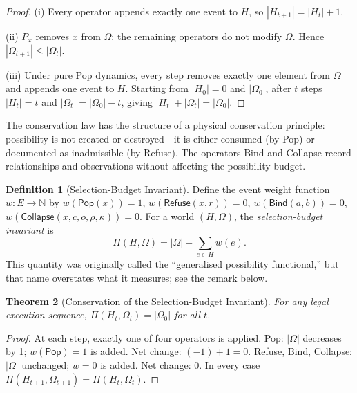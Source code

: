 \documentclass[12pt, a4paper, openany]{book}
\theoremstyle{plain}
\newtheorem{theorem}{Theorem}[chapter]
\theoremstyle{definition}
\newtheorem{definition}[theorem]{Definition}
\theoremstyle{remark}
\newcommand{\Pop}{\mathsf{Pop}}
\newcommand{\Refuse}{\mathsf{Refuse}}
\newcommand{\Bind}{\mathsf{Bind}}
\newcommand{\Collapse}{\mathsf{Collapse}}
\begin{document}
\begin{proof}
(i) Every operator appends exactly one event to $H$, so $|H_{t+1}| = |H_t| + 1$.

(ii) $P_x$ removes $x$ from $\Omega$; the remaining operators do not modify
$\Omega$. Hence $|\Omega_{t+1}| \leq |\Omega_t|$.

(iii) Under pure Pop dynamics, every step removes exactly one element from $\Omega$
and appends one event to $H$. Starting from $|H_0| = 0$ and $|\Omega_0|$, after
$t$ steps $|H_t| = t$ and $|\Omega_t| = |\Omega_0| - t$, giving
$|H_t| + |\Omega_t| = |\Omega_0|$.
\end{proof}

The conservation law has the structure of a physical conservation principle:
possibility is not created or destroyed---it is either consumed (by Pop) or
documented as inadmissible (by Refuse). The operators Bind and Collapse record
relationships and observations without affecting the possibility budget.

\begin{definition}[Selection-Budget Invariant]
\label{def:selection-budget}
Define the event weight function $w : E \to \mathbb{N}$ by $w(\Pop(x)) = 1$,
$w(\Refuse(x,r)) = 0$, $w(\Bind(a,b)) = 0$, $w(\Collapse(x,c,o,\rho,\kappa)) = 0$.
For a world $(H, \Omega)$, the \emph{selection-budget invariant} is
\[
\Pi(H, \Omega) = |\Omega| + \sum_{e \in H} w(e).
\]
This quantity was originally called the ``generalised possibility functional,''
but that name overstates what it measures; see the remark below.
\end{definition}

\begin{theorem}[Conservation of the Selection-Budget Invariant]
For any legal execution sequence, $\Pi(H_t, \Omega_t) = |\Omega_0|$ for all $t$.
\end{theorem}

\begin{proof}
At each step, exactly one of four operators is applied. Pop: $|\Omega|$ decreases
by 1; $w(\Pop) = 1$ is added. Net change: $(-1) + 1 = 0$. Refuse, Bind, Collapse:
$|\Omega|$ unchanged; $w = 0$ is added. Net change: $0$. In every case
$\Pi(H_{t+1}, \Omega_{t+1}) = \Pi(H_t, \Omega_t)$.
\end{proof}
\end{document}
